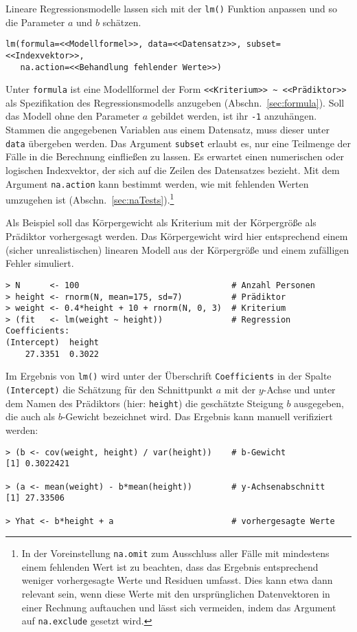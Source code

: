Lineare Regressionsmodelle lassen sich mit der \lstinline!lm()! Funktion anpassen und so die Parameter $a$ und $b$ schätzen.
\begin{lstlisting}
lm(formula=<<Modellformel>>, data=<<Datensatz>>, subset=<<Indexvektor>>,
   na.action=<<Behandlung fehlender Werte>>)
\end{lstlisting}

Unter \lstinline!formula! ist eine Modellformel der Form \lstinline!<<Kriterium>> ~ <<Prädiktor>>! als Spezifikation des Regressionsmodells anzugeben (Abschn.\ \ref{sec:formula}). Soll das Modell ohne den Parameter $a$ gebildet werden, ist ihr \lstinline!-1! anzuhängen. Stammen die angegebenen Variablen aus einem Datensatz, muss dieser unter \lstinline!data! übergeben werden. Das Argument \lstinline!subset! erlaubt es, nur eine Teilmenge der Fälle in die Berechnung einfließen zu lassen. Es erwartet einen numerischen oder logischen Indexvektor, der sich auf die Zeilen des Datensatzes bezieht. Mit dem Argument \lstinline!na.action! kann bestimmt werden, wie mit fehlenden Werten umzugehen ist (Abschn.\ \ref{sec:naTests}).\footnote{In der Voreinstellung \lstinline!na.omit! zum Ausschluss aller Fälle mit mindestens einem fehlenden Wert ist zu beachten, dass das Ergebnis entsprechend weniger vorhergesagte Werte und Residuen umfasst. Dies kann etwa dann relevant sein, wenn diese Werte mit den ursprünglichen Datenvektoren in einer Rechnung auftauchen und lässt sich vermeiden, indem das Argument auf \lstinline!na.exclude! gesetzt wird.}

Als Beispiel soll das Körpergewicht als Kriterium mit der Körpergröße als Prädiktor vorhergesagt werden. Das Körpergewicht wird hier entsprechend einem (sicher unrealistischen) linearen Modell aus der Körpergröße und einem zufälligen Fehler simuliert.
\begin{lstlisting}
> N      <- 100                               # Anzahl Personen
> height <- rnorm(N, mean=175, sd=7)          # Prädiktor
> weight <- 0.4*height + 10 + rnorm(N, 0, 3)  # Kriterium
> (fit   <- lm(weight ~ height))              # Regression
Coefficients:
(Intercept)  height
    27.3351  0.3022
\end{lstlisting}

Im Ergebnis von \lstinline!lm()! wird unter der Überschrift \lstinline!Coefficients! in der Spalte \lstinline!(Intercept)! die Schätzung für den Schnittpunkt $a$ mit der $y$-Achse und unter dem Namen des Prädiktors (hier: \lstinline!height!) die geschätzte Steigung $b$ ausgegeben, die auch als $b$-Gewicht bezeichnet wird. Das Ergebnis kann manuell verifiziert werden:
\begin{lstlisting}
> (b <- cov(weight, height) / var(height))    # b-Gewicht
[1] 0.3022421

> (a <- mean(weight) - b*mean(height))        # y-Achsenabschnitt
[1] 27.33506

> Yhat <- b*height + a                        # vorhergesagte Werte
\end{lstlisting}

